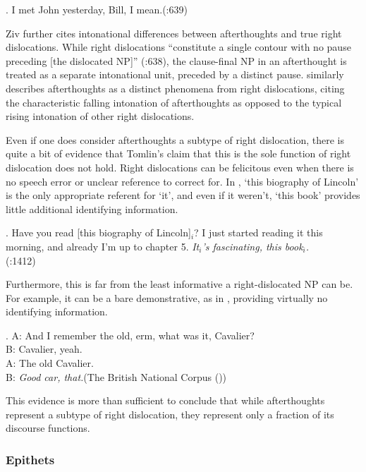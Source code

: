 \documentclass[titlepage,12pt]{article}
\begin{document}
\ex. I met John yesterday, Bill, I mean.\hfill(\citealt{ziv_left_1994}:639)

\par
Ziv further cites intonational differences between afterthoughts and true right dislocations. While right dislocations ``constitute a single contour with no pause preceding [the dislocated NP]'' (\citeyear{ziv_left_1994}:638), the clause-final NP in an afterthought is treated as a separate intonational unit, preceded by a distinct pause. \citet{aijmer_themes_1989} similarly describes afterthoughts as a distinct phenomena from right dislocations, citing the characteristic falling intonation of afterthoughts as opposed to the typical rising intonation of other right dislocations.

Even if one does consider afterthoughts a subtype of right dislocation, there is quite a bit of evidence that Tomlin's claim that this is the sole function of right dislocation does not hold. Right dislocations can be felicitous even when there is no speech error or unclear reference to correct for. In \Next, `this biography of Lincoln' is the only appropriate referent for `it', and even if it weren't, `this book' provides little additional identifying information. 

\ex. Have you read [this biography of Lincoln]$_i$? I just started reading it this morning, and already I'm up to chapter 5. \textit{It$_i$'s fascinating, this book$_i$.}\\
\phantom{x}\hfill (\citealt{huddleston_cambridge_2002}:1412) \label{lincoln}

Furthermore, this is far from the least informative a right-dislocated NP can be. For example, it can be a bare demonstrative, as in \Next, providing virtually no identifying information.

\ex. A: And I remember the old, erm, what was it, Cavalier?\\
B: Cavalier, yeah.\\
A: The old Cavalier.\\
B: \textit{Good car, that.}\hfill (The British National Corpus (\citealt{bnc_byu_2004})) \label{cavalier}

This evidence is more than sufficient to conclude that while afterthoughts represent a subtype of right dislocation, they represent only a fraction of its discourse functions.

\subsubsection{Epithets}
\end{document}
